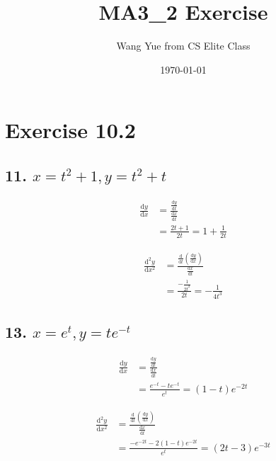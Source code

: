 \documentclass{article}
\begin{document}
    \title{MA3\_2 Exercise}
    \author{Wang Yue from CS Elite Class}
    \date{\today}

    \maketitle

    \section*{Exercise 10.2}

    \subsection*{11. $x = t^2 + 1, y = t^2 + t$}
    
    $$
    \begin{aligned}
        \frac{\mathrm{d}y}{\mathrm{d}x} &= \frac{\frac{\mathrm{d}y}{\mathrm{d}t}}{\frac{\mathrm{d}x}{\mathrm{d}t}} \\
        &= \frac{2t + 1}{2t} = 1 + \frac{1}{2t}
    \end{aligned}
    $$

    $$
    \begin{aligned}
        \frac{\mathrm{d^2}y}{\mathrm{d}x^2} &= \frac{\frac{\mathrm{d}}{\mathrm{d}t} (\frac{\mathrm{d}y}{\mathrm{d}x})}{\frac{\mathrm{d}x}{\mathrm{d}t}} \\
        &= \frac{-\frac{1}{2t^2}}{2t} = -\frac{1}{4t^3}
    \end{aligned}
    $$

    \subsection*{13. $x = e^t, y = te^{-t}$}

    $$
    \begin{aligned}
        \frac{\mathrm{d}y}{\mathrm{d}x} &= \frac{\frac{\mathrm{d}y}{\mathrm{d}t}}{\frac{\mathrm{d}x}{\mathrm{d}t}} \\
        &= \frac{e^{-t} - te^{-t}}{e^t} = (1 - t)e^{-2t}
    \end{aligned}
    $$

    $$
    \begin{aligned}
        \frac{\mathrm{d^2}y}{\mathrm{d}x^2} &= \frac{\frac{\mathrm{d}}{\mathrm{d}t} (\frac{\mathrm{d}y}{\mathrm{d}x})}{\frac{\mathrm{d}x}{\mathrm{d}t}} \\
        &= \frac{-e^{-2t} -2 (1 - t)e^{-2t}}{e^t} = (2t - 3)e^{-3t}
    \end{aligned}
    $$
\end{document}
